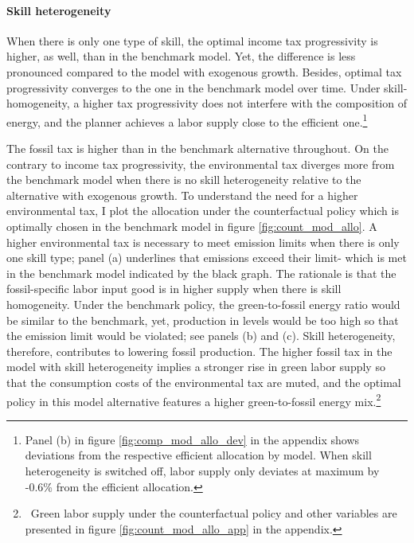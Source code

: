 \paragraph{Skill heterogeneity}
When there is only one type of skill, the optimal income tax progressivity is higher, as well, than in the benchmark model. Yet, the difference is less pronounced compared to the model with exogenous growth. Besides, optimal tax progressivity converges to the one in the benchmark model over time. 
Under skill-homogeneity, a higher tax progressivity does not interfere with the composition of energy, and the planner achieves a labor supply close to the efficient one.\footnote{ Panel (b) in figure \ref{fig:comp_mod_allo_dev} in the appendix shows deviations from the respective efficient allocation by model. When skill heterogeneity is switched off, labor supply only deviates at maximum by -0.6\% from the efficient allocation. }

 The fossil tax is higher than in the benchmark alternative throughout. 
On the contrary to income tax progressivity, the environmental tax diverges more from the benchmark model when there is no skill heterogeneity relative to the alternative with exogenous growth.
To understand the need for a higher environmental tax, I plot the allocation under the counterfactual policy which is optimally chosen in the benchmark model in figure \ref{fig:count_mod_allo}. 
A higher environmental tax is necessary to meet emission limits when there is only one skill type; panel (a) underlines that emissions exceed their limit- which is met in the benchmark model indicated by the black graph. The rationale is that the fossil-specific labor input good is in higher supply when there is skill homogeneity. Under the benchmark policy, the green-to-fossil energy ratio would be similar to the benchmark, yet, production in levels would be too high so that the emission limit would be violated; see panels (b) and (c). Skill heterogeneity, therefore, contributes to lowering fossil production. The higher fossil tax in the model with skill heterogeneity implies a stronger rise in green labor supply so that the consumption costs of the environmental tax are muted, and the optimal policy in this model alternative features a higher green-to-fossil energy mix.\footnote{\ Green labor supply under the counterfactual policy and other variables are presented in figure \ref{fig:count_mod_allo_app} in the appendix. }







